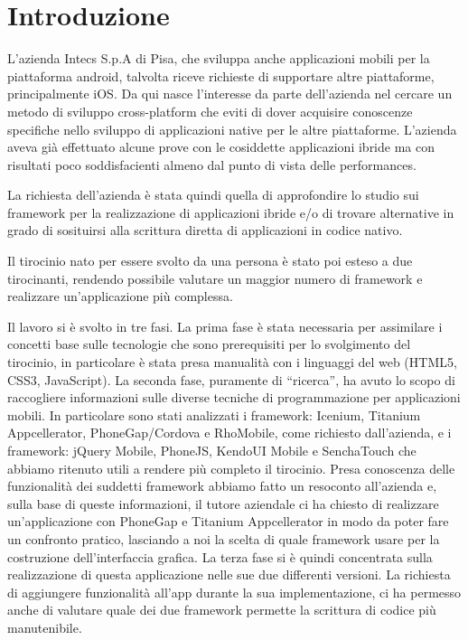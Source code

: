 \chapter{Introduzione}
	L'azienda Intecs S.p.A di Pisa, che sviluppa anche applicazioni mobili per la 
	piattaforma android, talvolta riceve richieste di supportare altre piattaforme,
	principalmente iOS. Da qui nasce l'interesse da parte dell'azienda nel
	cercare un metodo di sviluppo cross-platform che eviti di dover acquisire 
	conoscenze specifiche nello sviluppo di applicazioni native per le altre 
	piattaforme. L'azienda aveva già effettuato alcune prove con le cosiddette
	applicazioni ibride ma con risultati poco soddisfacienti almeno dal punto di
	vista delle performances.
	
	La richiesta dell'azienda è stata quindi quella di approfondire lo studio sui
	framework per la realizzazione di applicazioni ibride e/o di trovare alternative
	in grado di sosituirsi alla scrittura diretta di applicazioni in codice 
	nativo.
	
	Il tirocinio nato per essere svolto da una persona è stato poi esteso a due
	tirocinanti, rendendo possibile valutare un maggior numero di framework e 
	realizzare un'applicazione più complessa.
	
	Il lavoro si è svolto in tre fasi. La prima fase è stata necessaria per 
	assimilare i concetti base sulle tecnologie che sono prerequisiti per lo 
	svolgimento del tirocinio, in particolare è stata presa manualità con i 
	linguaggi del web (HTML5, CSS3, JavaScript). La seconda fase, puramente di
	``ricerca'', ha avuto lo scopo di raccogliere informazioni sulle diverse 
	tecniche di programmazione per applicazioni mobili. In particolare sono 
	stati analizzati i framework: Icenium, Titanium Appcellerator, 
	PhoneGap/Cordova e RhoMobile, come richiesto dall'azienda, e i framework:
	jQuery Mobile, PhoneJS, KendoUI Mobile e SenchaTouch che abbiamo ritenuto
	utili a rendere più completo il tirocinio.
	Presa conoscenza delle funzionalità dei suddetti framework abbiamo fatto un
	resoconto all'azienda e, sulla base di queste informazioni, il tutore 
	aziendale ci ha chiesto di realizzare un'applicazione con PhoneGap e Titanium 
	Appcellerator in modo da poter fare un confronto pratico, lasciando a noi la
	scelta di quale framework usare per la costruzione dell'interfaccia grafica.
	La terza fase si è quindi concentrata sulla realizzazione di questa 
	applicazione nelle sue due differenti versioni. La richiesta di aggiungere
	funzionalità all'app durante la sua implementazione, ci ha permesso anche di 
	valutare quale dei due framework permette la scrittura di codice più 
	manutenibile.
	
